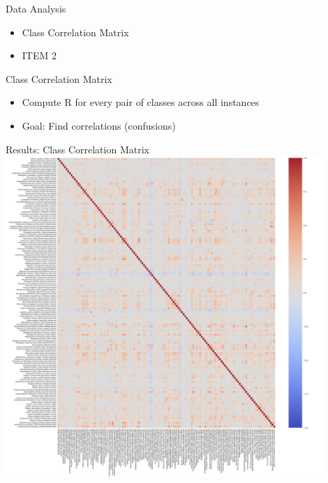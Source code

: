 

\begin{frame}{Data Analysis}
    \begin{itemize}
        \item Class Correlation Matrix
        \item ITEM 2
    \end{itemize}    
\end{frame}

\begin{frame}{Class Correlation Matrix}
    \begin{itemize}
        \item Compute R for every pair of classes across all instances
        \item Goal: Find correlations (confusions)
    \end{itemize}    
\end{frame}

\begin{frame}{Results: Class Correlation Matrix}
    \centering
    \includegraphics[height=0.9\textheight,width=0.9\textwidth,keepaspectratio]{images/no_filter.png}   
\end{frame}

